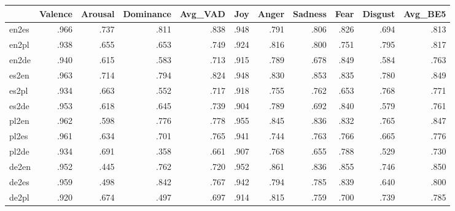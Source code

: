 \begin{tabular}{lrrrrrrrrrr}
\toprule
{} &  Valence &  Arousal &  Dominance &  Avg\_VAD &  Joy &  Anger &  Sadness &  Fear &  Disgust &  Avg\_BE5 \\
\midrule
en2es &     .966 &     .737 &       .811 &     .838 & .948 &   .791 &     .806 &  .826 &     .694 &     .813 \\
en2pl &     .938 &     .655 &       .653 &     .749 & .924 &   .816 &     .800 &  .751 &     .795 &     .817 \\
en2de &     .940 &     .615 &       .583 &     .713 & .915 &   .789 &     .678 &  .849 &     .584 &     .763 \\
es2en &     .963 &     .714 &       .794 &     .824 & .948 &   .830 &     .853 &  .835 &     .780 &     .849 \\
es2pl &     .934 &     .663 &       .552 &     .717 & .918 &   .755 &     .762 &  .653 &     .768 &     .771 \\
es2de &     .953 &     .618 &       .645 &     .739 & .904 &   .789 &     .692 &  .840 &     .579 &     .761 \\
pl2en &     .962 &     .598 &       .776 &     .778 & .955 &   .845 &     .836 &  .832 &     .765 &     .847 \\
pl2es &     .961 &     .634 &       .701 &     .765 & .941 &   .744 &     .763 &  .766 &     .665 &     .776 \\
pl2de &     .934 &     .691 &       .358 &     .661 & .907 &   .768 &     .655 &  .788 &     .529 &     .730 \\
de2en &     .952 &     .445 &       .762 &     .720 & .952 &   .861 &     .836 &  .855 &     .746 &     .850 \\
de2es &     .959 &     .498 &       .842 &     .767 & .942 &   .794 &     .785 &  .839 &     .640 &     .800 \\
de2pl &     .920 &     .674 &       .497 &     .697 & .914 &   .815 &     .759 &  .700 &     .739 &     .785 \\
\bottomrule
\end{tabular}

